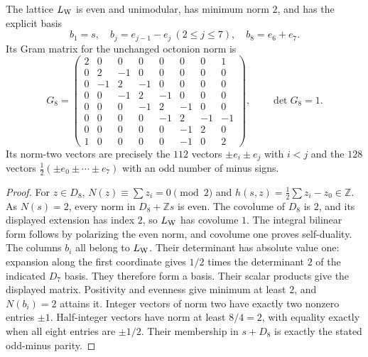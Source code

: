 \begin{lemma}\label{wcl:lem:e8}
The lattice $L_{\rm W}$ is even and unimodular, has minimum norm $2$,
and has the explicit basis
\[
 b_1=s,\quad b_j=e_{j-1}-e_j\ (2\le j\le7),\quad b_8=e_6+e_7.
\]
Its Gram matrix for the unchanged octonion norm is
\begin{equation}
 G_8=
 \begin{pmatrix}
 2&0&0&0&0&0&0&1\\
 0&2&-1&0&0&0&0&0\\
 0&-1&2&-1&0&0&0&0\\
 0&0&-1&2&-1&0&0&0\\
 0&0&0&-1&2&-1&0&0\\
 0&0&0&0&-1&2&-1&-1\\
 0&0&0&0&0&-1&2&0\\
 1&0&0&0&0&-1&0&2
 \end{pmatrix},\qquad \det G_8=1 .
 \label{wcl:eq:e8-gram}
\end{equation}
Its norm-two vectors are precisely the $112$ vectors $\pm e_i\pm e_j$
with $i<j$ and the $128$ vectors
$\frac12(\pm e_0\pm\cdots\pm e_7)$ with an odd number of minus signs.
\end{lemma}

\begin{proof}
For $z\in D_8$, $N(z)\equiv\sum z_i=0\pmod2$ and
$h(s,z)=\frac12\sum z_i-z_0\in\mathbb Z$.
As $N(s)=2$, every norm in $D_8+\mathbb Zs$ is even.
The covolume of $D_8$ is $2$, and its displayed extension has index
$2$, so $L_{\rm W}$ has covolume $1$. The integral bilinear form follows
by polarizing the even norm, and covolume one proves self-duality.
The columns $b_i$ all belong to $L_{\rm W}$. Their determinant has
absolute value one: expansion along the first coordinate gives
$1/2$ times the determinant $2$ of the indicated $D_7$ basis.
They therefore form a basis. Their scalar products give the displayed
matrix. Positivity and evenness give minimum at least $2$, and
$N(b_i)=2$ attains it. Integer vectors of norm two have exactly two
nonzero entries $\pm1$. Half-integer vectors have norm at least
$8/4=2$, with equality exactly when all eight entries are $\pm1/2$.
Their membership in $s+D_8$ is exactly the stated odd-minus parity.
\end{proof}

